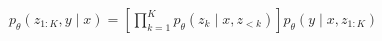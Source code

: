 \documentclass[border=3pt]{standalone}
\begin{document}
\color{ink}\fontsize{23}{28}\selectfont
$\displaystyle p_\theta(z_{1:K},y\mid x)=\left[\prod_{k=1}^{K}p_\theta(z_k\mid x,z_{<k})\right]p_\theta(y\mid x,z_{1:K})$
\end{document}
